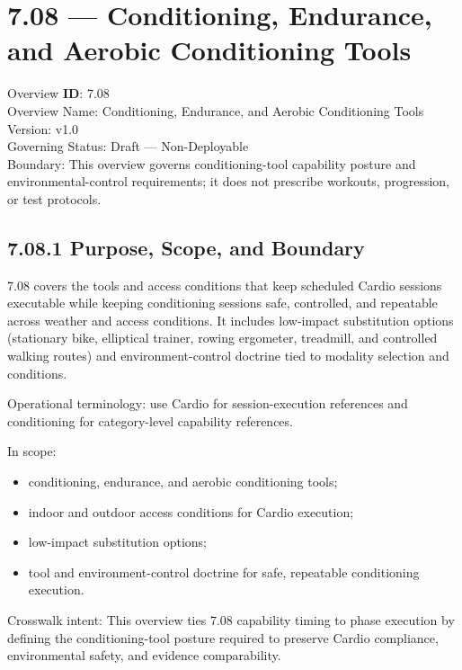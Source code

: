 \documentclass[10pt]{article}
\begin{document}
\section*{7.08 — Conditioning, Endurance, and Aerobic Conditioning Tools}
{}

Overview \textbf{ID}: 7.08\\
Overview Name: Conditioning, Endurance, and Aerobic Conditioning Tools\\
Version: v1.0\\
Governing Status: Draft — Non-Deployable\\
Boundary: This overview governs conditioning-tool capability posture and environmental-control requirements; it does not prescribe workouts, progression, or test protocols.

\subsection*{7.08.1 Purpose, Scope, and Boundary}
{}

7.08 covers the tools and access conditions that keep scheduled Cardio sessions executable while keeping conditioning sessions safe, controlled, and repeatable across weather and access conditions. It includes low-impact substitution options (stationary bike, elliptical trainer, rowing ergometer, treadmill, and controlled walking routes) and environment-control doctrine tied to modality selection and conditions.

Operational terminology: use Cardio for session-execution references and conditioning for category-level capability references.

In scope:
\begin{itemize}
\item conditioning, endurance, and aerobic conditioning tools;
\item indoor and outdoor access conditions for Cardio execution;
\item low-impact substitution options;
\item tool and environment-control doctrine for safe, repeatable conditioning execution.
\end{itemize}

Crosswalk intent: This overview ties 7.08 capability timing to phase execution by defining the conditioning-tool posture required to preserve Cardio compliance, environmental safety, and evidence comparability.
\end{document}
